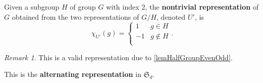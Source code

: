\documentclass[12pt, letterpaper]{article}
\theoremstyle{definition}
\theoremstyle{remark}
\newtheorem*{rem*}{Remark}
\theoremstyle{definition}
\theoremstyle{plain}
\numberwithin{equation}{section}
\begin{document}
	\begin{def*}
		Given a subgroup $H$ of group $G$ with index 2,
		the \textbf{nontrivial representation} of $G$ obtained 
		from the two representations of $G/H$, denoted $U'$, is
		\[\chi_{U'}(g)=\begin{cases}
			1&g\in H\\
			-1&g\notin H\\
		\end{cases}. \]
	\end{def*}
	\begin{rem*}
		This is a valid representation due to \ref{lemHalfGroupEvenOdd}.
		
		This is the \textbf{alternating representation} in $\mathfrak{S}_d$.
	\end{rem*}
\end{document}
